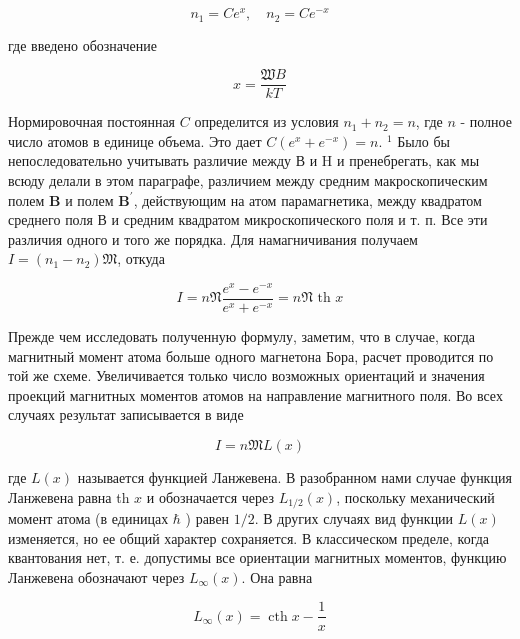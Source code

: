 \documentclass[12pt]{article}
\begin{document}
  \begin{equation}
  n_1=C e^x, \quad n_2=C e^{-x}
  \end{equation}

  где введено обозначение

  \begin{equation}
  x=\frac{\mathfrak{W} B}{k T}
  \end{equation}

  Нормировочная постоянная $C$ определится из условия $n_1+n_2=n$, где $n$ - полное число атомов в единице объема. Это дает $C\left(e^x+e^{-x}\right)=n$.
  ${ }^1$ Было бы непоследовательно учитывать различие между В и H и пренебрегать, как мы всюду делали в этом параграфе, различием между средним макроскопическим полем $\mathbf{B}$ и полем $\mathbf{B}^{\prime}$, действующим на атом парамагнетика, между квадратом среднего поля В и средним квадратом микроскопического поля и т. п. Все эти различия одного и того же порядка.
  Для намагничивания получаем $I=\left(n_1-n_2\right)\mathfrak{M}$, откуда

  \begin{equation}
  \label{eq:quantum}
  I=n \mathfrak{N} \frac{e^x-e^{-x}}{e^x+e^{-x}}=n \mathfrak{N} \text { th } x
  \end{equation}

  Прежде чем исследовать полученную формулу, заметим, что в случае, когда магнитный момент атома больше одного магнетона Бора, расчет проводится по той же схеме. Увеличивается только число возможных ориентаций и значения проекций магнитных моментов атомов на направление магнитного поля. Во всех случаях результат записывается в виде

  \begin{equation}
  I=n \mathfrak{M} L(x)
  \end{equation}

  где $L(x)$ называется функцией Ланжевена. В разобранном нами случае функция Ланжевена равна th $x$ и обозначается через $L_{1 / 2}(x)$, поскольку механический момент атома (в единицах $\hbar$ ) равен $1 / 2$. В других случаях вид функции $L(x)$ изменяется, но ее общий характер сохраняется. В классическом пределе, когда квантования нет, т. е. допустимы все ориентации магнитных моментов, функцию Ланжевена обозначают через $L_{\infty}(x)$. Она равна

  \begin{equation}
  \label{eq:lang}
  L_{\infty}(x)=\operatorname{cth} x-\frac{1}{x}
  \end{equation}
\end{document}
